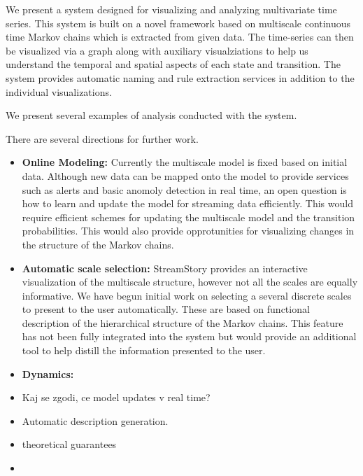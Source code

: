 We present a system designed for visualizing and analyzing multivariate time series. This system is built on a novel framework based on multiscale continuous time Markov chains which is extracted from given data. The time-series can then be visualized via a graph along with auxiliary visualziations to help us understand the temporal and spatial aspects of each state and transition. The system provides automatic naming and rule extraction services in addition to the individual visualizations. 

We present several examples of analysis conducted with the system. 

There are several directions for further work. 
\begin{itemize}
\item {\bf Online Modeling:} Currently the multiscale model is fixed based on initial data. Although new data can be mapped onto the model to provide services such as alerts and basic anomoly detection in real time, an open question is how to learn and update the model for streaming data efficiently. This would require efficient schemes for updating the multiscale model and the transition probabilities. This would also provide opprotunities for visualizing changes in the structure of the Markov chains.
\item {\bf Automatic scale selection:} StreamStory provides an interactive visualization of the multiscale structure, however not all the scales are equally informative.  We have begun initial work on selecting a several discrete scales to present to the user automatically. These are based on functional description of the hierarchical structure of the Markov chains. This feature has not been fully integrated into the system but would provide an additional tool to help distill the  information presented to the user. 
\item {\bf Dynamics:} 
\end{itemize}




\begin{itemize}
	\item Kaj se zgodi, ce model updates v real time?
	\item Automatic description generation.
	\item theoretical guarantees
	\item  
\end{itemize}